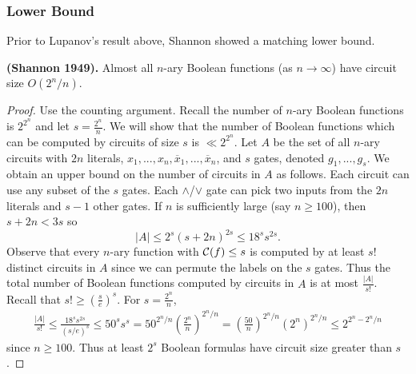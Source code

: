 \documentclass[11pt]{article}
\begin{document}
	\subsubsection{Lower Bound}
	\label{sssec:circuitsizelowerbd}
	Prior to Lupanov's result above, Shannon showed a matching lower bound. 
	\begin{theorem}
		\label{thm:shannon1949-circuitsizelowerbd}
		\textbf{(Shannon 1949).} Almost all $n$-ary Boolean functions (as $n \rightarrow \infty$) have circuit size $O(2^n/n)$.
	\end{theorem}
	\begin{proof}
		Use the counting argument. Recall the number of $n$-ary Boolean functions is $2^{2^{n}}$ and let $s = \frac{2^n}{n}$. We will show that the number of Boolean functions which can be computed by circuits of size $s$ is $\ll 2^{2^{n}}$. Let $A$ be the set of all $n$-ary circuits with $2n$ literals, $x_1, ..., x_n, \overline{x}_1, ..., \overline{x}_n$, and $s$ gates, denoted $g_1, ..., g_s$. We obtain an upper bound on the number of circuits in $A$ as follows. Each circuit can use any subset of the $s$ gates. Each $\land$/$\lor$ gate can pick two inputs from the $2n$ literals and $s-1$ other gates. If $n$ is sufficiently large (say $n \geq 100$), then $s + 2n < 3s$ so
		\[|A| \leq 2^s(s + 2n)^{2s} \leq 18^ss^{2s}.\] 
		Observe that every $n$-ary function with $\mathcal{C}(f) \leq s$ is computed by at least $s!$ distinct circuits in $A$ since we can permute the labels on the $s$ gates. Thus the total number of Boolean functions computed by circuits in $A$ is at most $\frac{|A|}{s!}$. Recall that $s! \geq \left(\frac{s}{e}\right)^s$. For $s = \frac{2^n}{n}$,
		\begin{align*}
			\frac{|A|}{s!} \leq \frac{18^ss^{2s}}{\left(s/e\right)^s} \leq 50^s s^{s} = 50^{2^n/n}\left(\frac{2^n}{n}\right)^{2^{n}/n} = \left(\frac{50}{n}\right)^{2^n/n}\left(2^{n}\right)^{2^{n}/n} \leq 2^{2^n-2^n/n}
		\end{align*}
		since $n \geq 100$. Thus at least $2^{s}$ Boolean formulas have circuit size greater than $s$.
	\end{proof}
	
\end{document}
